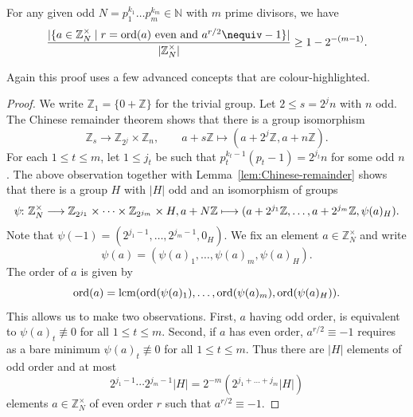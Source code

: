 \documentclass[a4paper, oneside, 12pt]{amsart}
\DeclareMathOperator{\lcm}{lcm}
\begin{document}
\begin{proposition}\label{prop:lots-of-good-candidates}
  For any given odd \(N=p_{1}^{k_{1}} \dots p_{m}^{k_{m}}\in \mathbb{N}\) with \(m\) prime divisors, we have
  \begin{equation}
    \frac{|\{a \in \mathbb{Z}_{N}^{\times} \mid r=\ord(a) \text{ even  and } a^{r/2}\nequiv-1\}|}{| \mathbb{Z}_{N}^{\times}|}
    \geq 1-2^{-(m-1)}.
  \end{equation}
\end{proposition}
Again this proof uses a few advanced concepts that are colour-highlighted.
\begin{proof}
  We write \( \mathbb{Z}_{1}= \{0 + \mathbb{Z}\}\) for the trivial group.
  Let \(2\leq s=2^{j}n\) with \(n\) odd.
  The {\color{gray} Chinese remainder theorem} shows that there is a {\color{gray} group isomorphism}
  \begin{equation*}
    \mathbb{Z}_{s} \to \mathbb{Z}_{2^{j}} \times \mathbb{Z}_{n}, \qquad a + s \mathbb{Z} \mapsto (a + 2^{j} \mathbb{Z}, a+ n \mathbb{Z}).
  \end{equation*}
  For each \(1\leq t \leq m\), let \(1\leq j_{t}\) be such that \(p_{t}^{k_{t}-1}(p_{t}-1) = 2^{j_{t}}n\) for some odd \(n\).
  The above observation together with Lemma~\ref{lem:Chinese-remainder} shows that there is a group \(H\) with \(|H|\) odd and an isomorphism of groups
  \begin{equation*}
    \psi \from \mathbb{Z}_N^{\times} \to \mathbb{Z}_{2^{j_{1}}} \times \dots \times \mathbb{Z}_{2^{j_{m}}} \times H, a + N \mathbb{Z}\mapsto (a+ 2^{j_{1}} \mathbb{Z}, \dots , a+ 2^{j_{m}} \mathbb{Z}, \psi(a)_{H}).
  \end{equation*}
  Note that \(\psi(-1) = (2^{j_{1}-1}, \dots , 2^{j_{m}-1},0_{H})\).
  We fix an element \(a\in \mathbb{Z}_{N}^{\times}\) and write
  \begin{equation*}
    \psi(a) = (\psi(a)_{1}, \dots , \psi(a)_{m}, \psi(a)_{H}).
  \end{equation*}
  The order of \(a\) is given by
  \begin{equation*}
    \ord(a) = \lcm(\ord(\psi(a)_{1}), \dots , \ord(\psi(a)_{m}), \ord(\psi(a)_{H})).
  \end{equation*}
  This allows us to make two observations.
  First, \(a\) having odd order, is equivalent to  \(\psi(a)_{t} \nequiv 0\) for all \(1\leq t \leq m\).
  Second, if \(a\) has even order, \(a^{r/2}\equiv -1\) requires as a bare minimum \(\psi(a)_{t} \nequiv 0\) for all \(1\leq t\leq m\).
  Thus there are \(|H|\) elements of odd order and at most
  \begin{equation*}
    2^{j_{1}-1} \cdots 2^{j_{m}-1}|H| = 2^{-m}(2^{j_{1} + \dots + j_{m}}|H|)
  \end{equation*}
  elements \(a \in \mathbb{Z}_{N}^{\times}\) of even order \(r\) such that \(a^{r/2}\equiv -1\).


\end{proof}
\end{document}
